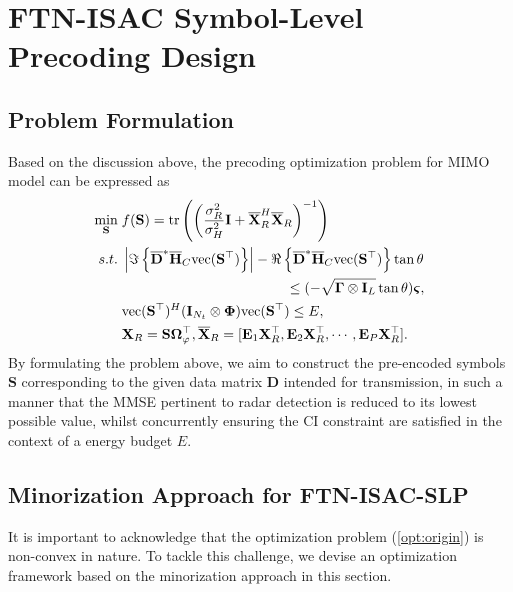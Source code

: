 \documentclass[lettersize,journal]{IEEEtran}
\newcommand{\nocolor}[1]{{\color{black}#1}}
\begin{document}
\section{FTN-ISAC Symbol-Level Precoding \nocolor{Design}}
\subsection{Problem Formulation}
Based on the discussion above, the precoding optimization problem for MIMO model can be expressed as
\begin{equation}
\label{opt:origin}
\begin{aligned}
    \underset{\mathbf{S}}{\min} &\;
    f(\mathbf{S})=\text{tr}\left(\left(\frac{\sigma_R^2}{\sigma_H^2}\mathbf{I}+\overline{\mathbf{X}}_R^H\overline{\mathbf{X}}_R\right)^{-1}\right) \\
    s.t. &\;
    \left| \Im\left\{\overline{\mathbf{D}}^{*}\overline{\mathbf{H}}_C\text{vec}(\mathbf{S}^{\top})\right\} \right| - \Re\left\{\overline{\mathbf{D}}^{*}\overline{\mathbf{H}}_C\text{vec}(\mathbf{S}^{\top})\right\}\tan\theta \\
    &\qquad\qquad\qquad\qquad\qquad\qquad
    \leq (-\sqrt{\mathbf{\Gamma}\otimes\mathbf{I}_L}\tan\theta)\bm{\varsigma}, \\
    &\; \text{vec}(\mathbf{S}^{\top})^H(\mathbf{I}_{N_t}\otimes\mathbf{\Phi})\text{vec}(\mathbf{S}^{\top})\leq E, \\
    &\;\nocolor{\mathbf{X}_R = \mathbf{S}\mathbf{\Omega}_{\varphi}^{\top}, \overline{\mathbf{X}}_R = [\mathbf{E}_{1}\mathbf{X}_R^{\top},\mathbf{E}_{2}\mathbf{X}_R^{\top},\cdots,\mathbf{E}_{P}\mathbf{X}_R^{\top}].}
\end{aligned}
\end{equation}
\nocolor{By formulating the problem above, we aim to} construct the pre-encoded symbols $\mathbf{S}$ corresponding to the given data matrix $\mathbf{D}$ intended for transmission, in such a manner that the MMSE pertinent to radar detection is reduced to its lowest possible value, whilst concurrently ensuring the CI constraint are satisfied in the context of a \nocolor{energy budget} $E$.

\subsection{Minorization Approach for FTN-ISAC-SLP}
It is important to acknowledge that the optimization problem (\ref{opt:origin}) is non-convex in nature. To tackle this challenge, we devise an optimization framework based on the minorization approach in this section.
\end{document}
